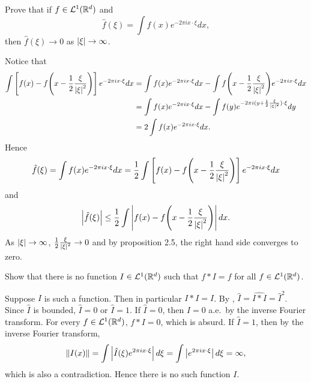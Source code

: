 \begin{exercise}
    Prove that if $f\in \mathcal{L}^1(\mathbb{R}^d)$ and 
    \begin{equation*}
        \hat{f}(\xi) = \int f(x)e^{-2\pi i x\cdot\xi}dx,
    \end{equation*}
    then $\hat{f}(\xi)\to 0$ as $\left\lvert {\xi} \right\rvert\to\infty$.
\end{exercise}
\begin{pf}
    Notice that 
    \begin{equation*}
        \begin{split}
            \int \sbrc{f(x)-f\pth{x - \frac{1}{2}\frac{\xi}{\abs{\xi}^2}}}e^{-2\pi i x\cdot\xi}dx 
            &= \int f(x)e^{-2\pi i x\cdot\xi}dx - \int f\pth{x - \frac{1}{2}\frac{\xi}{\abs{\xi}^2}}e^{-2\pi i x\cdot\xi}dx \\
            &= \int f(x)e^{-2\pi i x\cdot\xi}dx - \int f(y)e^{-2\pi i (y+\frac{1}{2}\frac{\xi}{\abs{\xi}^2})\cdot\xi}dy \\
            &= 2\int f(x)e^{-2\pi i x\cdot\xi}dx.
        \end{split}
    \end{equation*}
    Hence 
    \begin{equation*}
        \hat{f}(\xi) = \int f(x)e^{-2\pi i x\cdot\xi}dx = \frac{1}{2}\int \sbrc{f(x)-f\pth{x - \frac{1}{2}\frac{\xi}{\abs{\xi}^2}}}e^{-2\pi i x\cdot\xi}dx
    \end{equation*}
    and
    \begin{equation*}
        \abs{\hat{f}(\xi)} \leq \frac{1}{2}\int \abs{f(x)-f\pth{x - \frac{1}{2}\frac{\xi}{\abs{\xi}^2}}}dx.
    \end{equation*}
    As $\left\lvert {\xi} \right\rvert\to\infty$, $\frac{1}{2}\frac{\xi}{\left\lvert {\xi} \right\rvert^2}\to 0$ and by proposition 2.5, 
    the right hand side converges to zero. 
\end{pf}

\begin{exercise}
    Show that there is no function $I\in\mathcal{L}^1(\mathbb{R}^d)$ such that $f*I = f$ for all $f\in\mathcal{L}^1(\mathbb{R}^d)$.
\end{exercise}
\begin{pf}
    Suppose $I$ is such a function. Then in particular $I*I = I$. By , 
    $\hat{I} = \widehat{I*I} = \hat{I}^2$. Since $\hat{I}$ is bounded, $\hat{I} = 0$ or 
    $\hat{I} = 1$. If $\hat{I} = 0$, then $I = 0$ a.e.\ by the inverse Fourier transform. 
    For every $f\in\mathcal{L}^1(\mathbb{R}^d)$, $f*I = 0$, which is absurd. If $\hat{I} = 1$, then 
    by the inverse Fourier transform, 
    \begin{equation*}
        \left\lVert {I(x)} \right\rVert = \int \left\lvert {\hat{I}(\xi)e^{2\pi i x\cdot\xi}} \right\rvert d\xi = \int \left\lvert {e^{2\pi i x\cdot\xi}} \right\rvert d\xi = \infty,
    \end{equation*}
    which is also a contradiction. Hence there is no such function $I$.
\end{pf}

